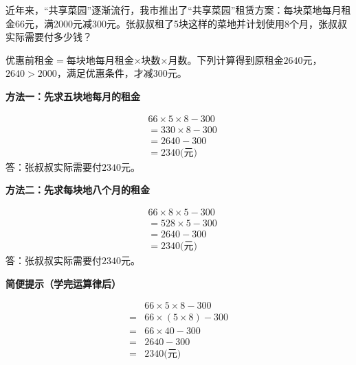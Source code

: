 近年来，“共享菜园”逐渐流行，我市推出了“共享菜园”租赁方案：每块菜地每月租金66元，满2000元减300元。张叔叔租了5块这样的菜地并计划使用8个月，张叔叔实际需要付多少钱？\par
{}
\begin{BookAnswer}
优惠前租金\(=\)每块地每月租金\(\times\)块数\(\times\)月数。下列计算得到原租金\(2640\)元，\allowbreak{}\(2640>2000\)，满足优惠条件，才减\(300\)元。\par \par\noindent\begin{minipage}{\linewidth}\textbf{方法一：先求五块地每月的租金}\par \[\begin{aligned}&66\times5\times8-300\\&=330\times8-300\\&=2640-300\\&=2340\text{(元)}\end{aligned}\]答：张叔叔实际需要付\(2340\)元。\end{minipage}\par \par \par\noindent\begin{minipage}{\linewidth}\textbf{方法二：先求每块地八个月的租金}\par \[\begin{aligned}&66\times8\times5-300\\&=528\times5-300\\&=2640-300\\&=2340\text{(元)}\end{aligned}\]答：张叔叔实际需要付\(2340\)元。\end{minipage}\par \par\textbf{简便提示（学完运算律后）}\par \[\begin{aligned}&66\times5\times8-300\\={}&66\times(5\times8)-300\\={}&66\times40-300\\={}&2640-300\\={}&2340\text{(元)}\end{aligned}\]
\end{BookAnswer}

